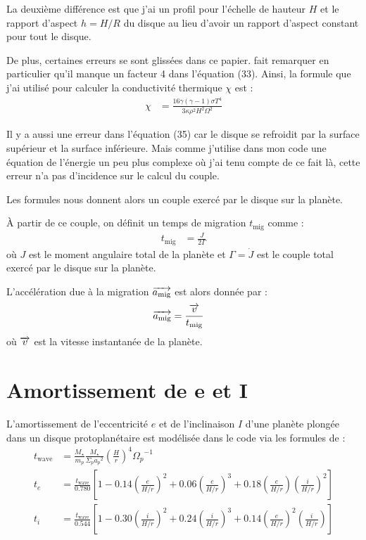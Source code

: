 La deuxième différence est que j'ai un profil pour l'échelle de hauteur $H$ et le rapport d'aspect $h=H/R$ du disque au lieu d'avoir un rapport d'aspect constant pour tout le disque.

\bigskip

De plus, certaines erreurs se sont glissées dans ce papier. \cite[appendice A]{bitsch2011range} fait remarquer en particulier qu'il manque un facteur 4 dans l'équation (33). Ainsi, la formule que j'ai utilisé pour calculer la conductivité thermique $\chi$ est :
\begin{align}
\chi &= \frac{16\gamma (\gamma-1) \sigma T^4}{3\kappa \rho^2 H^2\Omega^2}
\end{align}

Il y a aussi une erreur dans l'équation (35) car le disque se refroidit par la surface supérieur et la surface inférieure. Mais comme j'utilise dans mon code une équation de l'énergie  un peu plus complexe où j'ai tenu compte de ce fait là, cette erreur n'a pas d'incidence sur le calcul du couple.

Les formules nous donnent alors un couple exercé par le disque sur la planète. 

À partir de ce couple, on définit un temps de migration $t_\text{mig}$ comme : 
\begin{align}
t_\text{mig} &= \frac{J}{2\Gamma}
\end{align}
où $J$ est le moment angulaire total de la planète et $\Gamma=\dot{J}$ est le couple total exercé par le disque sur la planète.

L'accélération due à la migration ${\overrightarrow{a_\text{mig}}}$ est alors donnée par :
\begin{align}
{\overrightarrow{a_\text{mig}}} &= \frac{{\overrightarrow{v}}}{t_\text{mig}}
\end{align}
où ${\overrightarrow{v}}$ est la vitesse instantanée de la planète.

\section{Amortissement de e et I}
L'amortissement de l'eccentricité $e$ et de l'inclinaison $I$ d'une planète plongée dans un disque protoplanétaire est modélisée dans le code via les formules de \cite[eq. (9), (11) et (12)]{cresswell2008three} : 
\begin{subequations}
\begin{align}
t_\text{wave} &= \frac{M_\star}{m_p}\frac{M_\star}{\Sigma_p {a_p}^2}\left(\frac{H}{r}\right)^4{\Omega_p}^{-1}\\
t_e &= \frac{t_\text{wave}}{0.780}\left[1-0.14\left(\frac{e}{H/r}\right)^2 + 0.06 \left(\frac{e}{H/r}\right)^3 + 0.18\left(\frac{e}{H/r}\right)\left(\frac{i}{H/r}\right)^2\right]\\
t_i &= \frac{t_\text{wave}}{0.544}\left[1-0.30\left(\frac{i}{H/r}\right)^2 + 0.24 \left(\frac{i}{H/r}\right)^3 + 0.14\left(\frac{e}{H/r}\right)^2\left(\frac{i}{H/r}\right)\right]
\end{align}
\end{subequations}

